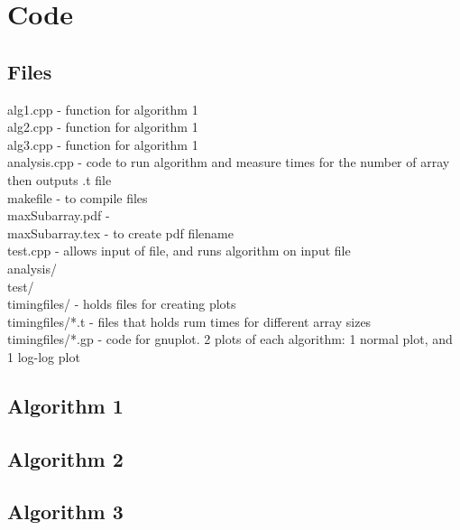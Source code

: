 \documentclass[a4paper,10pt]{article}
\begin{document}
	\newpage
	\section{Code}
		\subsection{Files}
			alg1.cpp - function for algorithm 1\\
			alg2.cpp - function for algorithm 1\\
			alg3.cpp - function for algorithm 1\\
			analysis.cpp - code to run algorithm and measure times for the number of array then outputs .t file\\
			makefile - to compile files\\
			maxSubarray.pdf - \\
			maxSubarray.tex - to create pdf filename\\
			test.cpp - allows input of file, and runs algorithm on input file\\
			analysis/\\
			test/\\
			timingfiles/ - holds files for creating plots\\
			timingfiles/*.t - files that holds rum times for different array sizes\\
			timingfiles/*.gp - code for gnuplot. 2 plots of each algorithm: 1 normal plot, and 1 log-log plot
		\subsection{Algorithm 1}
		
		\newpage
		\subsection{Algorithm 2}
		
		\newpage
		\subsection{Algorithm 3}
		
		
\end{document}
